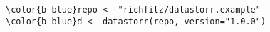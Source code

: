 \documentclass[class=minimal,border=0]{standalone}
\begin{document}
%
\begin{BVerbatim}[bgcolor=b-darkgrey]
\color{b-blue}repo <- "richfitz/datastorr.example"
\color{b-blue}d <- datastorr(repo, version="1.0.0")
\end{BVerbatim}
\end{document}
